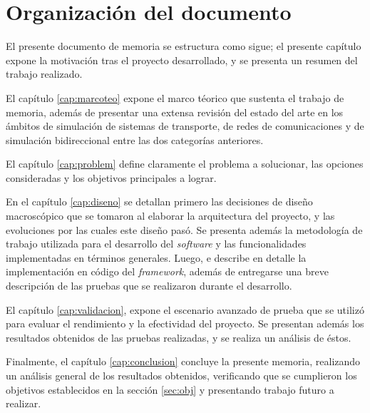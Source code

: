 \section{Organización del documento}

El presente documento de memoria se estructura como sigue; el presente capítulo expone la motivación tras el proyecto desarrollado, y se presenta un resumen del trabajo realizado.

El capítulo \ref{cap:marcoteo} expone el marco téorico que sustenta el trabajo de memoria, además de presentar una extensa revisión del estado del arte en los ámbitos de simulación de sistemas de transporte, de redes de comunicaciones y de simulación bidireccional entre las dos categorías anteriores.

El capítulo \ref{cap:problem} define claramente el problema a solucionar, las opciones consideradas y los objetivos principales a lograr.

En el capítulo \ref{cap:diseno} se detallan primero las decisiones de diseño macroscópico que se tomaron al elaborar la arquitectura del proyecto, y las evoluciones por las cuales este diseño pasó. Se presenta además la metodología de trabajo utilizada para el desarrollo del \emph{software} y las funcionalidades implementadas en términos generales. Luego, e describe en detalle la implementación en código del \emph{framework}, además de entregarse una breve descripción de las pruebas que se realizaron durante el desarrollo.

El capítulo \ref{cap:validacion}, expone el escenario avanzado de prueba que se utilizó para evaluar el rendimiento y la efectividad del proyecto. Se presentan además los resultados obtenidos de las pruebas realizadas, y se realiza un análisis de éstos.

Finalmente, el capítulo \ref{cap:conclusion} concluye la presente memoria, realizando un análisis general de los resultados obtenidos, verificando que se cumplieron los objetivos establecidos en la sección \ref{sec:obj} y presentando trabajo futuro a realizar.

